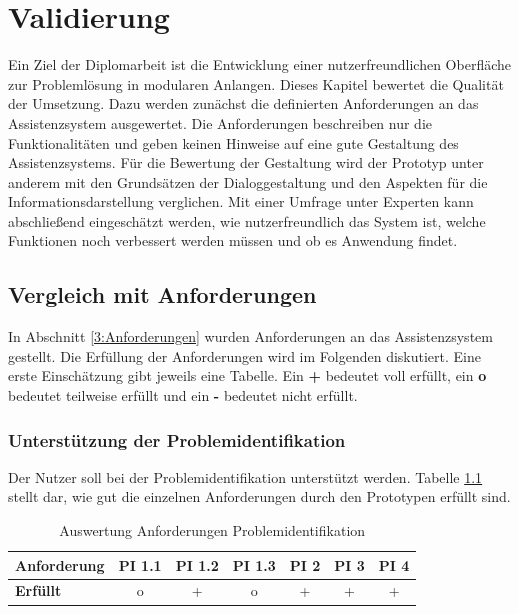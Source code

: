 \chapter{Validierung}
\label{Validierung}

Ein Ziel der Diplomarbeit ist die Entwicklung einer nutzerfreundlichen Oberfläche zur Problemlösung in modularen Anlangen. Dieses Kapitel bewertet die Qualität der Umsetzung. Dazu werden zunächst die definierten Anforderungen an das Assistenzsystem ausgewertet. Die Anforderungen beschreiben nur die Funktionalitäten und geben keinen Hinweise auf eine gute Gestaltung des Assistenzsystems. Für die Bewertung der Gestaltung wird der Prototyp unter anderem mit den Grundsätzen der Dialoggestaltung und den Aspekten für die Informationsdarstellung verglichen. Mit einer Umfrage unter Experten kann abschließend eingeschätzt werden, wie nutzerfreundlich das System ist, welche Funktionen noch verbessert werden müssen und ob es Anwendung findet.

\section{Vergleich mit Anforderungen}
In Abschnitt \ref{3:Anforderungen} wurden Anforderungen an das Assistenzsystem gestellt. Die Erfüllung der Anforderungen wird im Folgenden diskutiert. Eine erste Einschätzung gibt jeweils eine Tabelle. Ein \textbf{+} bedeutet voll erfüllt, ein \textbf{o} bedeutet teilweise erfüllt und ein \textbf{-} bedeutet nicht erfüllt.

\subsection{Unterstützung der Problemidentifikation}
Der Nutzer soll bei der Problemidentifikation unterstützt werden. Tabelle \ref{tab:Anforderungen-Problemidentifikation} stellt dar, wie gut die einzelnen Anforderungen durch den Prototypen erfüllt sind.
\begin{table}[htbp]
\caption{Auswertung Anforderungen Problemidentifikation}
\centering
\begin{tabular}{l|c|c|c|c|c|c}
\textbf{Anforderung} & PI 1.1 & PI 1.2 & PI 1.3 & PI 2 & PI 3 & PI 4 \\
\hline
\textbf{Erfüllt} & o & + & o & + & + & + \\
\end{tabular}
\label{tab:Anforderungen-Problemidentifikation}
\end{table}

